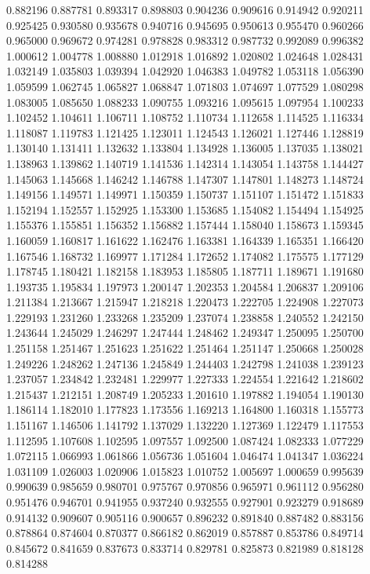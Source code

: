 0.882196
0.887781
0.893317
0.898803
0.904236
0.909616
0.914942
0.920211
0.925425
0.930580
0.935678
0.940716
0.945695
0.950613
0.955470
0.960266
0.965000
0.969672
0.974281
0.978828
0.983312
0.987732
0.992089
0.996382
1.000612
1.004778
1.008880
1.012918
1.016892
1.020802
1.024648
1.028431
1.032149
1.035803
1.039394
1.042920
1.046383
1.049782
1.053118
1.056390
1.059599
1.062745
1.065827
1.068847
1.071803
1.074697
1.077529
1.080298
1.083005
1.085650
1.088233
1.090755
1.093216
1.095615
1.097954
1.100233
1.102452
1.104611
1.106711
1.108752
1.110734
1.112658
1.114525
1.116334
1.118087
1.119783
1.121425
1.123011
1.124543
1.126021
1.127446
1.128819
1.130140
1.131411
1.132632
1.133804
1.134928
1.136005
1.137035
1.138021
1.138963
1.139862
1.140719
1.141536
1.142314
1.143054
1.143758
1.144427
1.145063
1.145668
1.146242
1.146788
1.147307
1.147801
1.148273
1.148724
1.149156
1.149571
1.149971
1.150359
1.150737
1.151107
1.151472
1.151833
1.152194
1.152557
1.152925
1.153300
1.153685
1.154082
1.154494
1.154925
1.155376
1.155851
1.156352
1.156882
1.157444
1.158040
1.158673
1.159345
1.160059
1.160817
1.161622
1.162476
1.163381
1.164339
1.165351
1.166420
1.167546
1.168732
1.169977
1.171284
1.172652
1.174082
1.175575
1.177129
1.178745
1.180421
1.182158
1.183953
1.185805
1.187711
1.189671
1.191680
1.193735
1.195834
1.197973
1.200147
1.202353
1.204584
1.206837
1.209106
1.211384
1.213667
1.215947
1.218218
1.220473
1.222705
1.224908
1.227073
1.229193
1.231260
1.233268
1.235209
1.237074
1.238858
1.240552
1.242150
1.243644
1.245029
1.246297
1.247444
1.248462
1.249347
1.250095
1.250700
1.251158
1.251467
1.251623
1.251622
1.251464
1.251147
1.250668
1.250028
1.249226
1.248262
1.247136
1.245849
1.244403
1.242798
1.241038
1.239123
1.237057
1.234842
1.232481
1.229977
1.227333
1.224554
1.221642
1.218602
1.215437
1.212151
1.208749
1.205233
1.201610
1.197882
1.194054
1.190130
1.186114
1.182010
1.177823
1.173556
1.169213
1.164800
1.160318
1.155773
1.151167
1.146506
1.141792
1.137029
1.132220
1.127369
1.122479
1.117553
1.112595
1.107608
1.102595
1.097557
1.092500
1.087424
1.082333
1.077229
1.072115
1.066993
1.061866
1.056736
1.051604
1.046474
1.041347
1.036224
1.031109
1.026003
1.020906
1.015823
1.010752
1.005697
1.000659
0.995639
0.990639
0.985659
0.980701
0.975767
0.970856
0.965971
0.961112
0.956280
0.951476
0.946701
0.941955
0.937240
0.932555
0.927901
0.923279
0.918689
0.914132
0.909607
0.905116
0.900657
0.896232
0.891840
0.887482
0.883156
0.878864
0.874604
0.870377
0.866182
0.862019
0.857887
0.853786
0.849714
0.845672
0.841659
0.837673
0.833714
0.829781
0.825873
0.821989
0.818128
0.814288
